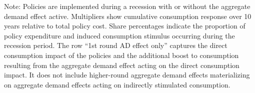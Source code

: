 \documentclass{econsocart}
\begin{document}
\begin{table}[tb] 
  \caption{\pregenmark Comparing fiscal stimulus policy effectiveness}
  \label{tab:Multiplier} 
  \centering


  \noindent\parbox{\textwidth}{
    \medskip
    \footnotesize Note: Policies are implemented during a recession with or without the aggregate demand effect active. Multipliers show cumulative consumption response over 10 years relative to total policy cost. Share percentages indicate the proportion of policy expenditure and induced consumption stimulus occurring during the recession period. The row ``1st round AD effect only'' captures the direct consumption impact of the policies and the additional boost to consumption resulting from the aggregate demand effect acting on the direct consumption impact. It does not include higher-round aggregate demand effects materializing on aggregate demand effects acting on indirectly stimulated consumption.
  }
\end{table}

\vspace{0.5em}
\end{document}
